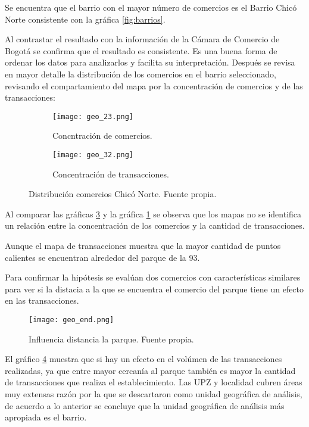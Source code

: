 \documentclass[a4paper]{article}
\begin{document}
Se encuentra que el barrio con el mayor número de comercios es el Barrio Chicó Norte consistente con la gráfica \ref{fig:barrios}. 

Al contrastar el resultado con la información de la Cámara de Comercio de Bogotá se confirma que el resultado es consistente. Es una buena forma de ordenar los datos para analizarlos y facilita su interpretación. Después se revisa en mayor detalle la distribución de los comercios en el barrio seleccionado, revisando el compartamiento del mapa por la concentración de comercios y de las transacciones:

\begin{figure}[!tbp]
	\begin{subfigure}[b]{0.4\textwidth}
		\texttt{[image: geo\_23.png]}
		\caption{Concntración de comercios.}
		\label{fig:concentracion_comercios}
	\end{subfigure}
	\hfill
	\begin{subfigure}[b]{0.4\textwidth}
		\texttt{[image: geo\_32.png]}
		\caption{Concentración de transacciones.}
		\label{fig:concentracion_transacciones}
	\end{subfigure}
	\caption{Distribución comercios Chicó Norte. Fuente propia.}
\end{figure}


Al comparar las gráficas \ref{fig:concentracion_transacciones} y la gráfica \ref{fig:concentracion_comercios} se observa que los mapas no se identifica un relación entre la concentración de los comercios y la cantidad de transacciones. 

Aunque el mapa de transacciones muestra que la mayor cantidad de puntos calientes se encuentran alrededor del parque de la 93. 

Para confirmar la hipótesis se evalúan dos comercios con características similares para ver si la distacia a la que se encuentra el comercio del parque tiene un efecto en las transacciones.

\begin{figure}[h]
    \centering
	\texttt{[image: geo\_end.png]}
    \caption{Influencia distancia la parque. Fuente propia.}
    \label{fig:parque}
\end{figure}

El gráfico \ref{fig:parque} muestra que si hay un efecto en el volúmen de las transacciones realizadas, ya que entre mayor cercanía al parque también es mayor la cantidad de transacciones que realiza el establecimiento. Las UPZ y localidad cubren áreas muy extensas razón por la que se descartaron como unidad geográfica de análisis, de acuerdo a lo anterior se concluye que la unidad geográfica de análisis más apropiada es el barrio.
\end{document}
